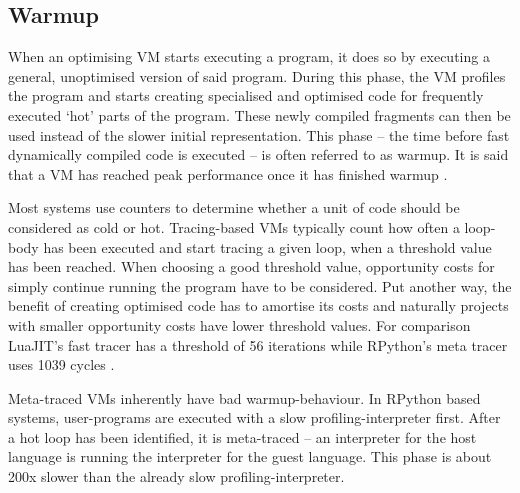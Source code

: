 










\subsection{Warmup}

When an optimising VM starts executing a program, it does so by executing a
general, unoptimised version of said program. During this phase, the VM profiles
the program and starts creating specialised and optimised code for frequently
executed `hot' parts of the program. These newly compiled fragments can then be
used instead of the slower initial representation. This phase -- the time before
fast dynamically compiled code is executed -- is often referred to as warmup.
It is said that a VM has reached peak performance once it has finished warmup
.

Most systems use counters to determine whether a unit of code should be
considered as cold or hot. Tracing-based VMs typically count how often a loop-body has
been executed and start tracing a given loop, when a threshold value has been
reached. When choosing a good threshold value, opportunity costs for simply
continue running the program have to be considered.  Put another way, the benefit
of creating optimised code has to amortise its costs and naturally projects with
smaller opportunity costs have lower threshold values. For comparison LuaJIT's
fast tracer has a threshold of 56 iterations while RPython's meta tracer uses
1039 cycles .

Meta-traced VMs inherently  have bad warmup-behaviour. In RPython based systems,
user-programs are executed with a slow profiling-interpreter first. After a hot
loop has been identified, it is meta-traced -- an interpreter for the host
language is running the interpreter for the guest language. This phase is about
200x slower than the already slow profiling-interpreter.


